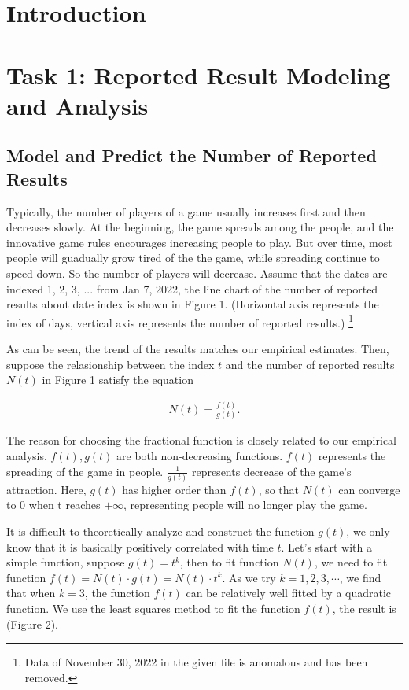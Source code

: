 \section{Introduction}

\section{Task 1: Reported Result Modeling and Analysis}

\subsection{Model and Predict the Number of Reported Results}
Typically, the number of players of a game usually increases first and then decreases slowly. At the beginning, the game spreads among the people, and the innovative game rules encourages increasing people to play. But over time, most people will guadually grow tired of the the game, while spreading continue to speed down. So the number of players will decrease. Assume that the dates are indexed 1, 2, 3, ... from Jan 7, 2022, the line chart of the number of reported results about date index is shown in Figure 1. (Horizontal axis represents the index of days, vertical axis represents the number of reported results.) \footnote{Data of November 30, 2022 in the given file is anomalous and has been removed.}


As can be seen, the trend of the results matches our empirical estimates. Then, suppose the relasionship between the index $t$ and the number of reported results $N(t)$ in Figure 1 satisfy the equation

\begin{equation}
	\begin{aligned}
		N(t) = \frac{f(t)}{g(t)}.
	\end{aligned}
\end{equation}  

The reason for choosing the fractional function is closely related to our empirical analysis. $f(t), g(t)$ are both non-decreasing functions. $f(t)$ represents the spreading of the game in people. $\frac{1}{g(t)}$ represents decrease of the game's attraction. Here, $g(t)$ has higher order than $f(t)$, so that $N(t)$ can converge to 0 when t reaches $+\infty$, representing people will no longer play the game.  

It is difficult to theoretically analyze and construct the function $g(t)$, we only know that it is basically positively correlated with time $t$. Let's start with a simple function, suppose $g(t) = t^k$, then to fit function $N(t)$, we need to fit function $f(t) = N(t)\cdot g(t) = N(t)\cdot t^k$. As we try $k = 1, 2, 3, \cdots$, we find that when $k = 3$, the function $f(t)$ can be relatively well fitted by a quadratic function. We use the least squares method to fit the function $f(t)$, the result is (Figure 2).

